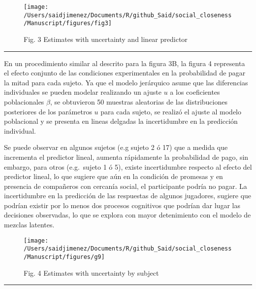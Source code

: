 \documentclass[12pt,]{article}
\begin{document}
\begin{figure}

{\centering \texttt{[image: /Users/saidjimenez/Documents/R/github\_Said/social\_closeness/Manuscript/figures/fig3]} 

}

\caption{Fig. 3 Estimates with uncertainty and linear predictor}\label{fig:fig3}
\end{figure}

\begin{center}\rule{0.5\linewidth}{\linethickness}\end{center}

En un procedimiento similar al descrito para la figura 3B, la figura 4
representa el efecto conjunto de las condiciones experimentales en la
probabilidad de pagar la mitad para cada sujeto. Ya que el modelo
jerárquico asume que las diferencias individuales se pueden modelar
realizando un ajuste \(u\) a los coeficientes poblacionales \(\beta\),
se obtuvieron 50 muestras aleatorias de las distribuciones posteriores
de los parámetros \(u\) para cada sujeto, se realizó el ajuste al modelo
poblacional y se presenta en lineas delgadas la incertidumbre en la
predicción individual.

Se puede observar en algunos sujetos (e.g sujeto 2 ó 17) que a medida
que incrementa el predictor lineal, aumenta rápidamente la probabilidad
de pago, sin embargo, para otros (e.g.~sujeto 1 ó 5), existe
incertidumbre respecto al efecto del predictor lineal, lo que sugiere
que aún en la condición de promesas y en presencia de compañeros con
cercanía social, el participante podría no pagar. La incertidumbre en la
predicción de las respuestas de algunos jugadores, sugiere que podrían
existir por lo menos dos procesos cognitivos que podrían dar lugar las
decisiones observadas, lo que se explora con mayor detenimiento con el
modelo de mezclas latentes.

\begin{figure}

{\centering \texttt{[image: /Users/saidjimenez/Documents/R/github\_Said/social\_closeness/Manuscript/figures/g9]} 

}

\caption{Fig. 4 Estimates with uncertainty by subject}\label{fig:fig4}
\end{figure}

\begin{center}\rule{0.5\linewidth}{\linethickness}\end{center}
\end{document}
